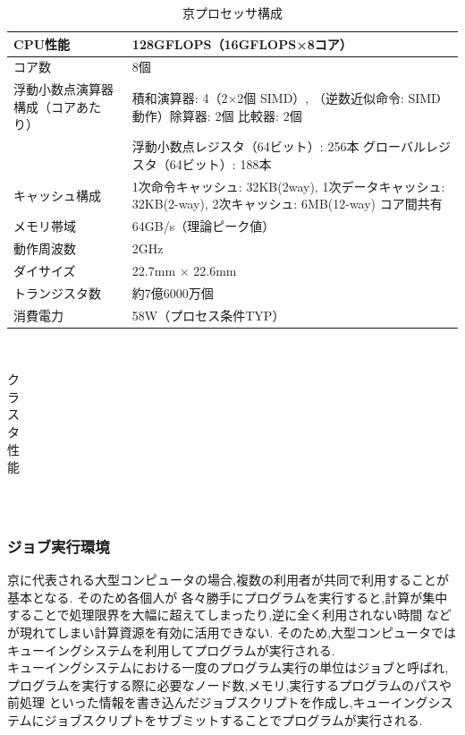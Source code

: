 \begin{table}[t]
  \begin{center}
    \begin{tabular}{|l|p{10cm}|}
      \hline
      CPU性能 & 128GFLOPS（16GFLOPS×8コア）\\ \hline
      コア数 & 8個\\ \hline
      浮動小数点演算器構成（コアあたり）& 積和演算器: 4（2×2個 SIMD）, （逆数近似命令: SIMD 動作）除算器: 2個 比較器: 2個\\ \cline{1-2}
      & 浮動小数点レジスタ（64ビット）: 256本 グローバルレジスタ（64ビット）: 188本\\ \cline{1-2}
      キャッシュ構成 & 1次命令キャッシュ: 32KB(2way), 1次データキャッシュ: 32KB(2-way), 2次キャッシュ: 6MB(12-way) コア間共有\\ \hline
      メモリ帯域 & 64GB/s（理論ピーク値）\\ \hline
      動作周波数 & 2GHz \\ \hline
      ダイサイズ & 22.7mm × 22.6mm \\ \hline
      トランジスタ数 & 約7億6000万個 \\ \hline
      消費電力 & 58W（プロセス条件TYP）\\ \hline
    \end{tabular}
  \end{center}
  \caption{京プロセッサ構成}
\end{table}~\\
\begin{table}[htb]
  \begin{center}
    \begin{tabular}{|c|p{12cm}|}
    \end{tabular}
  \end{center}
  \caption{クラスタ性能}
\end{table}~\\
\subsubsection{ジョブ実行環境}
京に代表される大型コンピュータの場合,複数の利用者が共同で利用することが基本となる. そのため各個人が
各々勝手にプログラムを実行すると,計算が集中することで処理限界を大幅に超えてしまったり,逆に全く利用されない時間
などが現れてしまい計算資源を有効に活用できない. そのため,大型コンピュータではキューイングシステムを利用してプログラムが実行される.\\
キューイングシステムにおける一度のプログラム実行の単位はジョブと呼ばれ,プログラムを実行する際に必要なノード数,メモリ,実行するプログラムのパスや前処理
といった情報を書き込んだジョブスクリプトを作成し,キューイングシステムにジョブスクリプトをサブミットすることでプログラムが実行される.~\\


